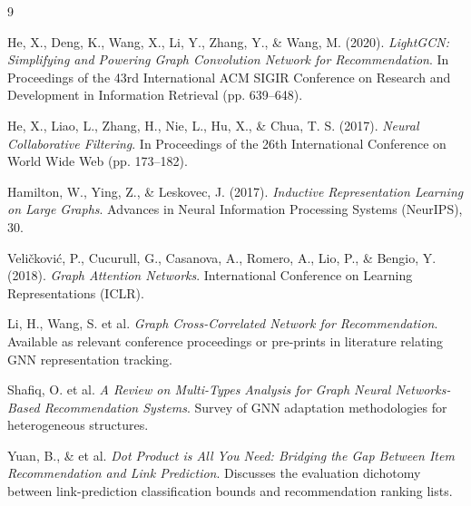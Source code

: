 \documentclass[12pt, a4paper]{article}
\begin{document}
\begin{thebibliography}{9}

He, X., Deng, K., Wang, X., Li, Y., Zhang, Y., \& Wang, M. (2020).
\textit{LightGCN: Simplifying and Powering Graph Convolution Network for Recommendation}. 
In Proceedings of the 43rd International ACM SIGIR Conference on Research and Development in Information Retrieval (pp. 639–648).

He, X., Liao, L., Zhang, H., Nie, L., Hu, X., \& Chua, T. S. (2017).
\textit{Neural Collaborative Filtering}. 
In Proceedings of the 26th International Conference on World Wide Web (pp. 173–182).

Hamilton, W., Ying, Z., \& Leskovec, J. (2017).
\textit{Inductive Representation Learning on Large Graphs}. 
Advances in Neural Information Processing Systems (NeurIPS), 30.

Veličković, P., Cucurull, G., Casanova, A., Romero, A., Lio, P., \& Bengio, Y. (2018).
\textit{Graph Attention Networks}. 
International Conference on Learning Representations (ICLR).

Li, H., Wang, S. et al. 
\textit{Graph Cross-Correlated Network for Recommendation}. 
Available as relevant conference proceedings or pre-prints in literature relating GNN representation tracking.

Shafiq, O. et al. 
\textit{A Review on Multi-Types Analysis for Graph Neural Networks-Based Recommendation Systems}. 
Survey of GNN adaptation methodologies for heterogeneous structures.

Yuan, B., \& et al. 
\textit{Dot Product is All You Need: Bridging the Gap Between Item Recommendation and Link Prediction}. 
Discusses the evaluation dichotomy between link-prediction classification bounds and recommendation ranking lists.

\end{thebibliography}
\end{document}

